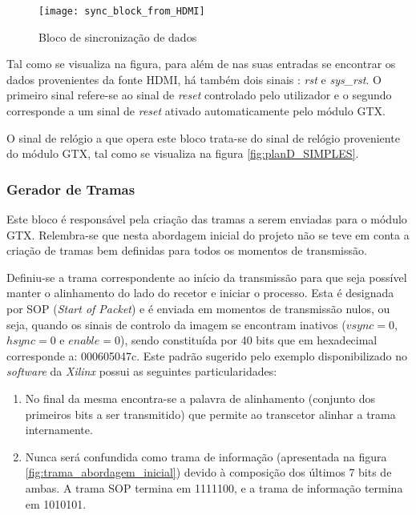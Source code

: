 \begin{figure}[h!]
	\begin{center}
		\leavevmode
		\texttt{[image: sync\_block\_from\_HDMI]}
		\captionsetup{width=1.0\linewidth}
		\caption[Bloco de sincronização de dados]{Bloco de sincronização de dados}
		\label{fig:sync_block}
	\end{center}
\end{figure}

Tal como se visualiza na figura, para além de nas suas entradas se encontrar os dados provenientes da fonte HDMI, há também dois sinais : \textit{rst} e \textit{sys\_rst}. O primeiro sinal refere-se ao sinal de \textit{reset} controlado pelo utilizador e o segundo corresponde a um sinal de \textit{reset} ativado automaticamente pelo módulo GTX.

O sinal de relógio a que opera este bloco trata-se do sinal de relógio proveniente do módulo GTX, tal como se visualiza na figura \ref{fig:planD_SIMPLES}.

\subsubsection*{Gerador de Tramas} \label{subsub:serial_frameGenerator}

Este bloco é responsável pela criação das tramas a serem enviadas para o módulo GTX. Relembra-se que nesta abordagem inicial do projeto não se teve em conta a criação de tramas bem definidas para todos os momentos de transmissão. 

Definiu-se a trama correspondente ao início da transmissão para que seja possível manter o alinhamento do lado do recetor e iniciar o processo. Esta é designada por  SOP (\textit{Start of Packet}) e é enviada em momentos de transmissão nulos, ou seja, quando os sinais de controlo da imagem se encontram inativos ($vsync = 0$, $hsync = 0$ e $enable = 0$), sendo constituída por 40 bits que em hexadecimal corresponde a: 000605047c. Este padrão sugerido pelo exemplo disponibilizado no \textit{software} da \textit{Xilinx} possui as seguintes particularidades:

\begin{enumerate}
	\item No final da mesma encontra-se a palavra de alinhamento (conjunto dos primeiros bits a ser transmitido) que permite ao transcetor alinhar a trama internamente.
	\item Nunca será confundida como trama de informação (apresentada na figura \ref{fig:trama_abordagem_inicial}) devido à composição dos últimos 7  bits de ambas. A trama SOP termina em 1111100, e a trama de informação termina em 1010101.
\end{enumerate}



